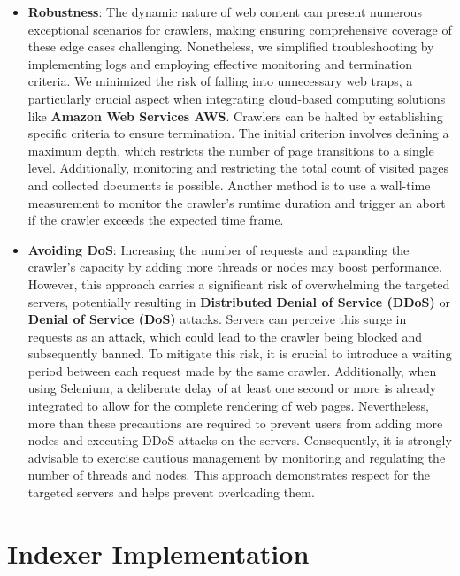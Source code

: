 \begin{itemize}
\item[]  \textbf{Robustness}: The dynamic nature of web content can present numerous exceptional scenarios for crawlers, making ensuring comprehensive coverage of these edge cases challenging. Nonetheless, we simplified troubleshooting by implementing logs and employing effective monitoring and termination criteria. We minimized the risk of falling into unnecessary web traps, a particularly crucial aspect when integrating cloud-based computing solutions like \textbf{Amazon Web Services AWS}. Crawlers can be halted by establishing specific criteria to ensure termination. The initial criterion involves defining a maximum depth, which restricts the number of page transitions to a single level. Additionally, monitoring and restricting the total count of visited pages and collected documents is possible. Another method is to use a wall-time measurement to monitor the crawler's runtime duration and trigger an abort if the crawler exceeds the expected time frame. 

\item[]  \textbf{Avoiding DoS}: Increasing the number of requests and expanding the crawler's capacity by adding more threads or nodes may boost performance. However, this approach carries a significant risk of overwhelming the targeted servers, potentially resulting in \textbf{Distributed Denial of Service (DDoS)} or \textbf{Denial of Service (DoS)} attacks. Servers can perceive this surge in requests as an attack, which could lead to the crawler being blocked and subsequently banned.
To mitigate this risk, it is crucial to introduce a waiting period between each request made by the same crawler. Additionally, when using Selenium, a deliberate delay of at least one second or more is already integrated to allow for the complete rendering of web pages. Nevertheless, more than these precautions are required to prevent users from adding more nodes and executing DDoS attacks on the servers. Consequently, it is strongly advisable to exercise cautious management by monitoring and regulating the number of threads and nodes. This approach demonstrates respect for the targeted servers and helps prevent overloading them.

\end{itemize}

\section{Indexer Implementation}\label{sec:indexer-implementation}

